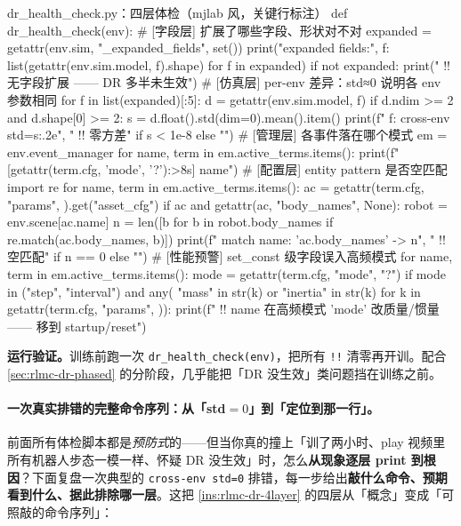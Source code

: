 \begin{codebox}[Python]{dr\_health\_check.py：四层体检（mjlab 风，关键行标注）}
def dr_health_check(env):
    # [字段层] 扩展了哪些字段、形状对不对
    expanded = getattr(env.sim, "_expanded_fields", set())
    print("expanded fields:", {f: list(getattr(env.sim.model, f).shape) for f in expanded})
    if not expanded:
        print("  !! 无字段扩展 —— DR 多半未生效")
    # [仿真层] per-env 差异：std≈0 说明各 env 参数相同
    for f in list(expanded)[:5]:
        d = getattr(env.sim.model, f)
        if d.ndim >= 2 and d.shape[0] >= 2:
            s = d.float().std(dim=0).mean().item()
            print(f"  {f}: cross-env std={s:.2e}", "  !! 零方差" if s < 1e-8 else "")
    # [管理层] 各事件落在哪个模式
    em = env.event_manager
    for name, term in em.active_terms.items():
        print(f"  [{getattr(term.cfg, 'mode', '?'):>8s}] {name}")
    # [配置层] entity pattern 是否空匹配
    import re
    for name, term in em.active_terms.items():
        ac = getattr(term.cfg, "params", {}).get("asset_cfg")
        if ac and getattr(ac, "body_names", None):
            robot = env.scene[ac.name]
            n = len([b for b in robot.body_names if re.match(ac.body_names, b)])
            print(f"  match {name}: '{ac.body_names}' -> {n}", "  !! 空匹配" if n == 0 else "")
    # [性能预警] set_const 级字段误入高频模式
    for name, term in em.active_terms.items():
        mode = getattr(term.cfg, "mode", "?")
        if mode in ("step", "interval") and any(
                "mass" in str(k) or "inertia" in str(k)
                for k in getattr(term.cfg, "params", {})):
            print(f"  !! {name} 在高频模式 '{mode}' 改质量/惯量 —— 移到 startup/reset")
\end{codebox}

\textbf{运行验证。}训练前跑一次 \verb|dr_health_check(env)|，把所有 \verb|!!| 清零再开训。配合 \cref{sec:rlmc-dr-phased} 的分阶段，几乎能把「DR 没生效」类问题挡在训练之前。

\paragraph{一次真实排错的完整命令序列：从「std$=0$」到「定位到那一行」。}前面所有体检脚本都是\emph{预防式}的——但当你真的撞上「训了两小时、play 视频里所有机器人步态一模一样、怀疑 DR 没生效」时，怎么\textbf{从现象逐层 print 到根因}？下面复盘一次典型的 \verb|cross-env std=0| 排错，每一步给出\textbf{敲什么命令、预期看到什么、据此排除哪一层}。这把 \cref{ins:rlmc-dr-4layer} 的四层从「概念」变成「可照敲的命令序列」：

